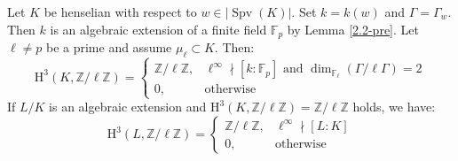 \begin{proposition}\label{2.5}
Let $K$ be henselian with respect to $w\in|\operatorname{Spv}(K)|$. Set $k=k(w)$ and $\Gamma = \Gamma_w$. Then $k$ is an algebraic extension of a finite field $\mathbb{F}_p$ by Lemma \ref{2.2-pre}. Let $\ell\neq p$ be a prime and assume $\mu_\ell\subset K$. Then:
\[ \mathrm{H}^3(K, \mathbb{Z}/\ell\mathbb{Z}) = \begin{cases}
\mathbb{Z}/\ell\mathbb{Z}, & \ell^\infty\nmid [k:\mathbb{F}_p] \text{ and } \dim_{\mathbb{F}_\ell}(\Gamma / \ell\Gamma) = 2\\
0, & \text{otherwise}
\end{cases} \]
If $L/K$ is an algebraic extension and $\mathrm{H}^3(K, \mathbb{Z}/\ell\mathbb{Z}) = \mathbb{Z}/\ell\mathbb{Z}$ holds, we have:
\[ \mathrm{H}^3(L,\mathbb{Z}/\ell\mathbb{Z}) = \begin{cases}
\mathbb{Z}/\ell\mathbb{Z}, & \ell^\infty\nmid [L:K]\\
0, & \text{otherwise}
\end{cases} \]
\end{proposition}


